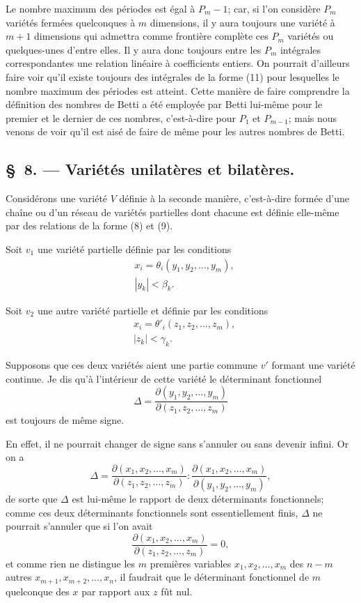 \documentclass{article}
\begin{document}
Le nombre maximum des périodes est égal à $P_{m} - 1$; car, si l'on considère $P_{m}$ variétés fermées quelconques à $m$ dimensions, il y aura toujours une variété à $m + 1$ dimensions qui admettra comme frontière complète
ces $P_{m}$ variétés ou quelques-unes d'entre elles. Il y aura donc toujours entre les $P_{m}$ intégrales correspondantes une relation linéaire à coefficients entiers. On pourrait d'ailleurs faire voir qu'il existe toujours des intégrales de la forme (11) pour lesquelles le nombre maximum des périodes est atteint. Cette manière de faire comprendre la définition des nombres de Betti a été employée par Betti lui-même pour le premier et le dernier de ces nombres, c'est-à-dire pour $P_{1}$ et $P_{m-1}$; mais nous venons de voir qu'il est aisé de faire de même pour les autres nombres de Betti.

\subsection*{\S~8. --- Variétés unilatères et bilatères.}

Considérons une variété $V$ définie à la seconde manière, c'est-à-dire formée d'une chaîne ou d'un réseau de variétés partielles dont chacune est définie elle-même par des relations de la forme (8) et (9).

Soit $v_{1}$ une variété partielle définie par les conditions
\[
\begin{aligned}
&x_{i} = \theta_{i}(y_{1}, y_{2}, \ldots, y_{m}),\\
&|y_{k}| < \beta_{k}.
\end{aligned}
\]

Soit $v_{2}$ une autre variété partielle et définie par les conditions
\[
\begin{aligned}
&x_{i} = \theta'_{i}(z_{1}, z_{2}, \ldots, z_{m}),\\
&|z_{k}| < \gamma_{k}.
\end{aligned}
\]

Supposons que ces deux variétés aient une partie commune $v'$ formant une variété continue. Je dis qu'à l'intérieur de cette variété le déterminant fonctionnel
\[
\Delta = \frac{\partial(y_{1}, y_{2}, \ldots, y_{m})}{\partial(z_{1}, z_{2}, \ldots, z_{m})}
\]
est toujours de même signe.

En effet, il ne pourrait changer de signe sans s'annuler ou sans devenir
infini. Or on a
\[
\Delta = \frac{\partial(x_{1}, x_{2}, \ldots, x_{m})}{\partial(z_{1}, z_{2}, \ldots, z_{m})} : \frac{\partial(x_{1}, x_{2}, \ldots, x_{m})}{\partial(y_{1}, y_{2}, \ldots, y_{m})},
\]
de sorte que $\Delta$ est lui-même le rapport de deux déterminants fonctionnels; comme ces deux déterminants fonctionnels sont essentiellement finis, $\Delta$ ne pourrait s'annuler que si l'on avait
\[
\frac{\partial(x_{1}, x_{2}, \ldots, x_{m})}{\partial(z_{1}, z_{2}, \ldots, z_{m})} = 0,
\]
et comme rien ne distingue les $m$ premières variables $x_{1}, x_{2}, \ldots, x_{m}$ des $n - m$ autres $x_{m+1}, x_{m+2}, \ldots, x_{n}$, il faudrait que le déterminant fonctionnel de $m$ quelconque des $x$ par rapport aux $z$ fût nul.
\end{document}
